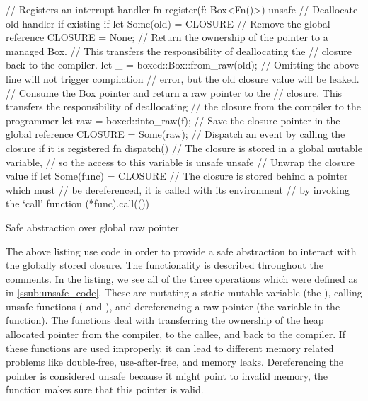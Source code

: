 \begin{listing}[H]
  \begin{rustcode}
// Registers an interrupt handler
fn register(f: Box<Fn()>) {
  unsafe {
    // Deallocate old handler if existing
    if let Some(old) = CLOSURE {
      // Remove the global reference
      CLOSURE = None;
      // Return the ownership of the pointer to a managed Box.
      // This transfers the responsibility of deallocating the
      // closure back to the compiler.
      let _ = boxed::Box::from_raw(old);
      // Omitting the above line will not trigger compilation
      // error, but the old closure value will be leaked.
    }
    // Consume the Box pointer and return a raw pointer to the
    // closure. This transfers the responsibility of deallocating
    // the closure from the compiler to the programmer
    let raw = boxed::into_raw(f);
    // Save the closure pointer in the global reference
    CLOSURE = Some(raw);
  }
}
// Dispatch an event by calling the closure if it is registered
fn dispatch() {
  // The closure is stored in a global mutable variable,
  // so the access to this variable is unsafe
  unsafe {
    // Unwrap the closure value
    if let Some(func) = CLOSURE {
        // The closure is stored behind a pointer which must
        // be dereferenced, it is called with its environment
        // by invoking the `call' function
        (*func).call(())
    }
  }
}
  \end{rustcode}
  \caption{Safe abstraction over global raw pointer}
  \label{lst:reg-disp}
\end{listing}

The above listing use {\unsafe} code in order to provide a safe abstraction to interact with the globally stored closure.
The functionality is described throughout the comments.
In the listing, we see all of the three operations which were defined as {\unsafe} in \autoref{ssub:unsafe_code}.
These are mutating a static mutable variable (the ), calling unsafe functions ( and ), and dereferencing a raw pointer (the  variable in the  function).
The {\unsafe} functions deal with transferring the ownership of the heap allocated pointer from the compiler, to the callee, and back to the compiler.
If these functions are used improperly, it can lead to different memory related problems like double-free, use-after-free, and memory leaks.
Dereferencing the  pointer is considered unsafe because it might point to invalid memory, the  function makes sure that this pointer is valid.

